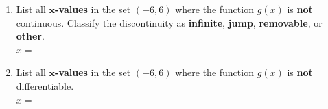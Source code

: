 \documentclass[12pt]{article}
\renewcommand{\emph}[1]{\textsf{\textbf{#1}}}
\let\ds\displaystyle
\newenvironment{subproblems}
{\begin{enumerate}\renewcommand{\labelenumi}{\emph{\alph{enumi}.}}}
{\end{enumerate}}
\begin{document}
\begin{subproblems}

\begingroup
\setlength{\parskip}{2.5em}
\setlength{\columnsep}{1 cm}

\endgroup

\bigskip

\item List all \emph{$\mathbf{x}$-values} in the set $(-6, 6)$ where the function $g(x)$ is \emph{not} continuous. Classify the discontinuity as {\bf infinite}, {\bf jump}, {\bf removable}, or {\bf other}.\\
 
$x = $ \ \hrulefill

\bigskip

\item List all \emph{$\mathbf{x}$-values} in the set $(-6, 6)$ where the function $g(x)$ is \emph{not} differentiable.\\
 
$x = $ \ \hrulefill

\bigskip


\end{subproblems}
\end{document}
